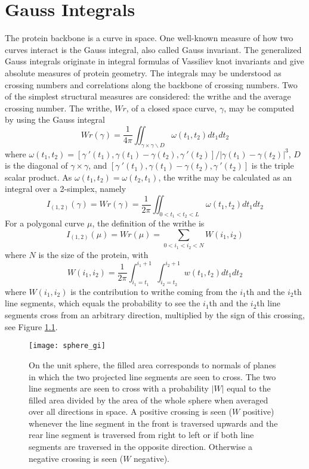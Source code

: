 
\chapter{Gauss Integrals}
\label{appendix:gauss_integrals}
The protein backbone is a curve in space. One well-known measure of how two curves interact is the Gauss integral, also called Gauss invariant. The generalized Gauss integrals originate in integral formulas of Vassiliev knot invariants \cite{Bar-Natan1995} and give absolute measures of protein geometry. The integrals may be understood as crossing numbers and correlations along the backbone of crossing numbers. Two of the simplest structural measures are considered: the writhe and the average crossing number. The writhe, $Wr$, of a closed space curve, $\gamma$, may be computed by using the Gauss integral
\begin{equation}
 Wr(\gamma) = \frac{1}{4\pi}\iint_{\gamma \times \gamma \backslash D} \omega(t_1, t_2)dt_1dt_2
\end{equation}
where $\omega(t_1, t_2) = [\gamma\ '(t_1), \gamma(t_1) - \gamma(t_2), \gamma\ '(t_2)] / |\gamma(t_1) - \gamma(t_2)|^3$, $D$ is the diagonal of $\gamma \times \gamma$, and $[\gamma\ '(t_1), \gamma(t_1) - \gamma(t_2), \gamma\ '(t_2)]$ is the triple scalar product. As $\omega(t_1, t_2) = \omega(t_2, t_1)$, the writhe may be calculated as an integral over a 2-simplex, namely
\begin{equation}
 I_{(1,2)}(\gamma) = Wr(\gamma) = \frac{1}{2\pi}\iint_{0 < t_1 < t_2 < L} \omega(t_1, t_2)dt_1dt_2
\end{equation}
For a polygonal curve $\mu$, the definition of the writhe is
\begin{equation}
 I_{(1,2)}(\mu) = Wr(\mu) = \sum_{0 < i_1 < i_2 < N} W(i_1, i_2)
\end{equation}
where $N$ is the size of the protein, with 
\begin{equation}
 W(i_1, i_2) = \frac{1}{2\pi}\int_{i_1 = t_1}^{i_1 + 1} \int_{i_2 = t_2}^{i_2 + 1} w(t_1, t_2)dt_1dt_2
\end{equation}
where $W(i_1, i_2)$ is the contribution to writhe coming from the $i_1$th and the $i_2$th line segments, which equals the probability to see the $i_1$th and the $i_2$th line segments cross from an arbitrary direction, multiplied by the sign of this crossing, see Figure \ref{fig:sphere_gi}. 
\begin{figure}[tb]
	\begin{center}
		\texttt{[image: sphere\_gi]}
		\caption[Gauss integrals and crossings]{On the unit sphere, the filled area corresponds to normals of planes in which the two projected line segments are seen to cross. The two line segments are seen to cross with a probability $|W|$ equal to the filled area divided by the area of the whole sphere when averaged over all directions in space. A positive crossing is seen ($W$ positive) whenever the line segment in the front is traversed upwards and the rear line segment is traversed from right to left or if both line segments are traversed in the opposite direction. Otherwise a negative crossing is seen ($W$ negative).}
		\label{fig:sphere_gi}
	\end{center}
\end{figure}
